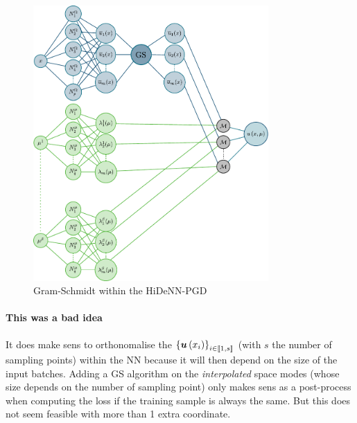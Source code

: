 \begin{figure}
    \centering
    \includegraphics[width = 0.8\textwidth]{Schema/GramSchmidt_NN.pdf}
    \caption{Gram-Schmidt within the HiDeNN-PGD}
    \label{fig:GS_NN}
\end{figure}

\paragraph{This was a bad idea}
It does make sens to orthonomalise the $\left\{ \boldsymbol{u}\left( x_i \right) \right\}_{ i \in \llbracket 1, s \rrbracket}$ (with $s$ the number of sampling points) within the NN because it will then depend on the size of the input batches.
Adding a GS algorithm on the \emph{interpolated} space modes (whose size depends on the number of sampling point) only makes sens as a post-process when computing the loss if the training sample is always the same. But this does not seem feasible with more than 1 extra coordinate.

